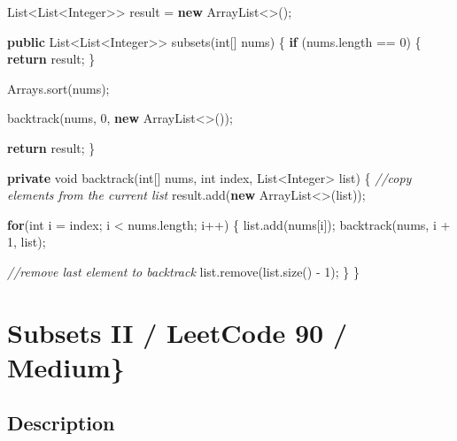 \documentclass[]{book}
\newenvironment{Shaded}{\begin{snugshade}}{\end{snugshade}}
\newcommand{\BuiltInTok}[1]{#1}
\newcommand{\CommentTok}[1]{\textcolor[rgb]{0.56,0.35,0.01}{\textit{#1}}}
\newcommand{\DataTypeTok}[1]{\textcolor[rgb]{0.13,0.29,0.53}{#1}}
\newcommand{\DecValTok}[1]{\textcolor[rgb]{0.00,0.00,0.81}{#1}}
\newcommand{\FunctionTok}[1]{\textcolor[rgb]{0.00,0.00,0.00}{#1}}
\newcommand{\KeywordTok}[1]{\textcolor[rgb]{0.13,0.29,0.53}{\textbf{#1}}}
\newcommand{\NormalTok}[1]{#1}
\begin{document}
\begin{Shaded}
\begin{Highlighting}[]
\BuiltInTok{List}\NormalTok{<}\BuiltInTok{List}\NormalTok{<}\BuiltInTok{Integer}\NormalTok{>> result = }\KeywordTok{new} \BuiltInTok{ArrayList}\NormalTok{<>();}

\KeywordTok{public} \BuiltInTok{List}\NormalTok{<}\BuiltInTok{List}\NormalTok{<}\BuiltInTok{Integer}\NormalTok{>> }\FunctionTok{subsets}\NormalTok{(}\DataTypeTok{int}\NormalTok{[] nums) \{}
    \KeywordTok{if}\NormalTok{ (nums.}\FunctionTok{length}\NormalTok{ == }\DecValTok{0}\NormalTok{) \{}
        \KeywordTok{return}\NormalTok{ result;}
\NormalTok{    \}}

    \BuiltInTok{Arrays}\NormalTok{.}\FunctionTok{sort}\NormalTok{(nums);}

    \FunctionTok{backtrack}\NormalTok{(nums, }\DecValTok{0}\NormalTok{, }\KeywordTok{new} \BuiltInTok{ArrayList}\NormalTok{<>());}

    \KeywordTok{return}\NormalTok{ result;}
\NormalTok{\}}

\KeywordTok{private} \DataTypeTok{void} \FunctionTok{backtrack}\NormalTok{(}\DataTypeTok{int}\NormalTok{[] nums, }\DataTypeTok{int}\NormalTok{ index, }\BuiltInTok{List}\NormalTok{<}\BuiltInTok{Integer}\NormalTok{> list) \{}
    \CommentTok{//copy elements from the current list}
\NormalTok{    result.}\FunctionTok{add}\NormalTok{(}\KeywordTok{new} \BuiltInTok{ArrayList}\NormalTok{<>(list));}

    \KeywordTok{for}\NormalTok{(}\DataTypeTok{int}\NormalTok{ i = index; i < nums.}\FunctionTok{length}\NormalTok{; i++) \{}
\NormalTok{        list.}\FunctionTok{add}\NormalTok{(nums[i]);}
        \FunctionTok{backtrack}\NormalTok{(nums, i + }\DecValTok{1}\NormalTok{, list);}

        \CommentTok{//remove last element to backtrack}
\NormalTok{        list.}\FunctionTok{remove}\NormalTok{(list.}\FunctionTok{size}\NormalTok{() - }\DecValTok{1}\NormalTok{);}
\NormalTok{    \}}
\NormalTok{\}}
\end{Highlighting}
\end{Shaded}

\hypertarget{subsets-ii-leetcode-90-medium}{%
\section{Subsets II / LeetCode 90 / Medium\}}\label{subsets-ii-leetcode-90-medium}}

\hypertarget{description-17}{%
\subsection{Description}\label{description-17}}
\end{document}
